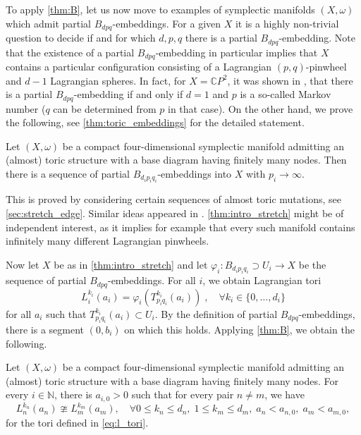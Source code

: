 \documentclass[12pt,a4paper,abstract=true,draft]{scrartcl}
\begin{document}
To apply \cref{thm:B}, let us now move to examples of symplectic manifolds $(X,\omega)$ which admit partial $B_{dpq}$-embeddings.
For a given $X$ it is a highly non-trivial question to decide if and for which $d,p,q$ there is a partial $B_{dpq}$-embedding.
Note that the existence of a partial $B_{dpq}$-embedding in particular implies that $X$ contains a particular configuration consisting of a Lagrangian $(p,q)$-pinwheel and $d-1$ Lagrangian spheres.
In fact, for $X = \mathbb{C}P^2$, it was shown in \cite{EvaSmi18}, that there is a partial $B_{dpq}$-embedding if and only if $d=1$ and $p$ is a so-called Markov number ($q$ can be determined from $p$ in that case).
On the other hand, we prove the following, see \cref{thm:toric_embeddings} for the detailed statement.

\begin{proposition}
    \label{thm:intro_stretch}
  Let $(X,\omega)$ be a compact four-dimensional symplectic manifold admitting an (almost) toric structure with a base diagram having finitely many nodes.
Then there is a sequence of partial $B_{d_i p_i q_i}$-embeddings into $X$ with $p_i \rightarrow \infty$. 
\end{proposition}

This is proved by considering certain sequences of almost toric mutations, see \cref{sec:stretch_edge}.
Similar ideas appeared in \cite{EvaUrz21}.
\cref{thm:intro_stretch} might be of independent interest, as it implies for example that every such manifold contains infinitely many different Lagrangian pinwheels. 

Now let $X$ be as in \cref{thm:intro_stretch} and let $\varphi_i \colon B_{d_i p_i q_i} \supset U_i \rightarrow X$ be the sequence of partial $B_{dpq}$-embeddings.
For all $i$, we obtain Lagrangian tori
\begin{equation}
    \label{eq:l_tori}
    L^{k_i}_i(a_i) = \varphi_i(T^{k_i}_{p_i q_i}(a_i))\;, \quad
    \forall k_i \in \{0,\ldots,d_i\}
\end{equation}
for all $a_i$ such that $T^{k_i}_{p_i q_i}(a_i) \subset U_i$.
By the definition of partial $B_{dpq}$-embeddings, there is a segment $(0,b_i)$ on which this holds.
Applying \cref{thm:B}, we obtain the following. 
   

\begin{maintheorem}
    \label{thm:C}
    Let $(X,\omega)$ be a compact four-dimensional symplectic manifold admitting an (almost) toric structure with a base diagram having finitely many nodes.
For every $i \in \mathbb{N}$, there is $a_{i,0} > 0$ such that for every pair $n \neq m$, we have
    \begin{equation}
        L^{k_n}_n(a_n) \ncong L^{k_m}_m(a_m), \quad
        \forall 0 ≤ k_n ≤ d_n,\; 1 ≤ k_m ≤ d_m, \; a_n < a_{n,0}, \; a_m < a_{m,0},
    \end{equation}
    for the tori defined in \eqref{eq:l_tori}.
\end{maintheorem}
\end{document}
